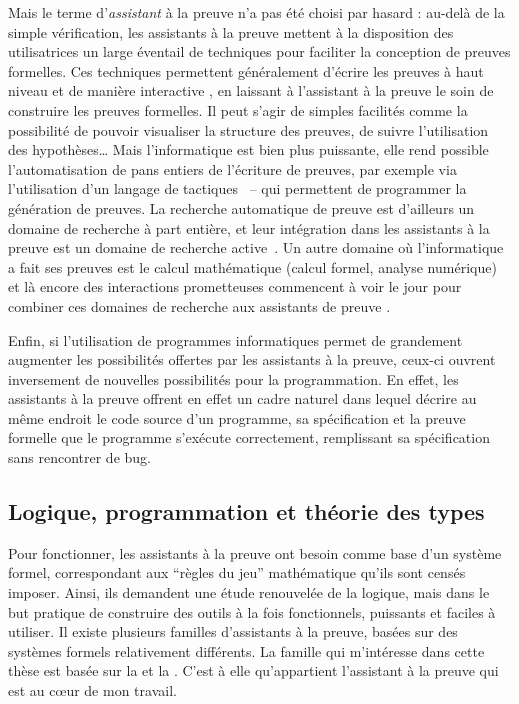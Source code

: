 Mais le terme d’\emph{assistant} à la preuve n’a pas été choisi par hasard : au-delà
de la simple vérification, les assistants à la preuve mettent à la disposition des 
utilisatrices un large éventail de techniques pour faciliter la conception de preuves formelles.
Ces techniques permettent généralement d’écrire
les preuves à haut niveau et de manière interactive%
, en laissant à l’assistant à la preuve le soin de construire les preuves formelles.
Il peut s’agir de simples facilités
comme la possibilité de pouvoir visualiser la structure des
preuves, de suivre l’utilisation des hypothèses…
Mais l’informatique est bien plus puissante, elle rend possible
l’automatisation de pans entiers de l’écriture de preuves,
par exemple via l’utilisation d’un langage de tactiques~ –
qui permettent de programmer la génération de preuves.
La recherche automatique de preuve est d’ailleurs un domaine de recherche à part entière,
et leur intégration dans les assistants à la
preuve est un domaine de recherche active~.
Un autre domaine où l’informatique a fait ses preuves est le calcul mathématique
(calcul formel, analyse numérique) et là encore des interactions prometteuses
commencent à voir le jour pour combiner ces domaines de recherche aux assistants de preuve
.

Enfin, si l’utilisation de programmes informatiques permet de grandement augmenter
les possibilités offertes par les assistants à la preuve, ceux-ci ouvrent inversement
de nouvelles possibilités pour la programmation.
En effet, les assistants à la preuve
offrent en effet un cadre naturel dans lequel décrire au même endroit
le code source d’un programme, sa spécification et la preuve formelle que le
programme s’exécute correctement, remplissant sa spécification sans rencontrer de bug.


\subsection{Logique, programmation et théorie des types}

Pour fonctionner, les assistants à la preuve ont besoin comme base d’un système
formel, correspondant aux “règles du jeu” mathématique qu’ils sont censés imposer.
Ainsi, ils demandent une étude renouvelée de la logique, mais dans le but
pratique de construire des outils à la fois fonctionnels,
puissants et faciles à utiliser.
Il existe plusieurs familles d’assistants à la preuve, basées sur des
systèmes formels relativement différents. La famille qui m’intéresse dans cette thèse
est basée sur la 
et la .
C’est à elle qu’appartient l’assistant à la preuve  qui est au cœur de mon
travail.

